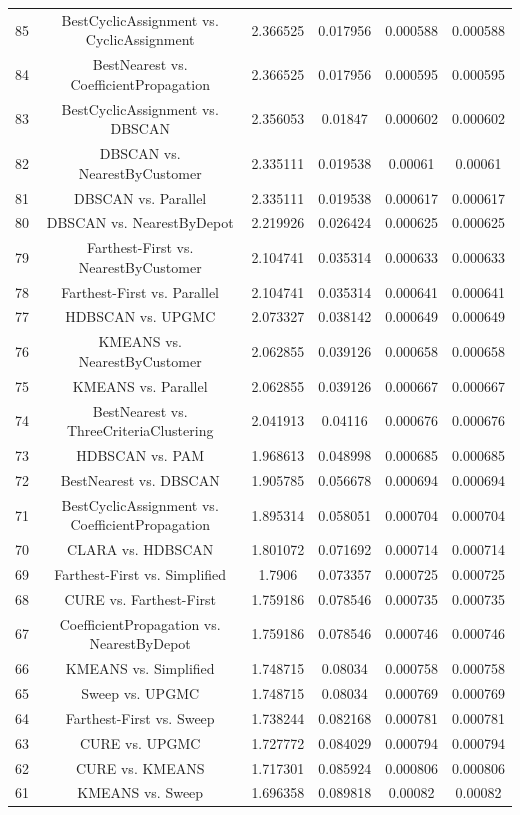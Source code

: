 \documentclass[a4paper,10pt]{article}
\begin{document}
\begin{landscape}
\begin{table}[!htp]
\begin{tabular}{cccccc}
85&BestCyclicAssignment vs. CyclicAssignment&2.366525&0.017956&0.000588&0.000588\\
84&BestNearest vs. CoefficientPropagation&2.366525&0.017956&0.000595&0.000595\\
83&BestCyclicAssignment vs. DBSCAN&2.356053&0.01847&0.000602&0.000602\\
82&DBSCAN vs. NearestByCustomer&2.335111&0.019538&0.00061&0.00061\\
81&DBSCAN vs. Parallel&2.335111&0.019538&0.000617&0.000617\\
80&DBSCAN vs. NearestByDepot&2.219926&0.026424&0.000625&0.000625\\
79&Farthest-First vs. NearestByCustomer&2.104741&0.035314&0.000633&0.000633\\
78&Farthest-First vs. Parallel&2.104741&0.035314&0.000641&0.000641\\
77&HDBSCAN vs. UPGMC&2.073327&0.038142&0.000649&0.000649\\
76&KMEANS vs. NearestByCustomer&2.062855&0.039126&0.000658&0.000658\\
75&KMEANS vs. Parallel&2.062855&0.039126&0.000667&0.000667\\
74&BestNearest vs. ThreeCriteriaClustering&2.041913&0.04116&0.000676&0.000676\\
73&HDBSCAN vs. PAM&1.968613&0.048998&0.000685&0.000685\\
72&BestNearest vs. DBSCAN&1.905785&0.056678&0.000694&0.000694\\
71&BestCyclicAssignment vs. CoefficientPropagation&1.895314&0.058051&0.000704&0.000704\\
70&CLARA vs. HDBSCAN&1.801072&0.071692&0.000714&0.000714\\
69&Farthest-First vs. Simplified&1.7906&0.073357&0.000725&0.000725\\
68&CURE vs. Farthest-First&1.759186&0.078546&0.000735&0.000735\\
67&CoefficientPropagation vs. NearestByDepot&1.759186&0.078546&0.000746&0.000746\\
66&KMEANS vs. Simplified&1.748715&0.08034&0.000758&0.000758\\
65&Sweep vs. UPGMC&1.748715&0.08034&0.000769&0.000769\\
64&Farthest-First vs. Sweep&1.738244&0.082168&0.000781&0.000781\\
63&CURE vs. UPGMC&1.727772&0.084029&0.000794&0.000794\\
62&CURE vs. KMEANS&1.717301&0.085924&0.000806&0.000806\\
61&KMEANS vs. Sweep&1.696358&0.089818&0.00082&0.00082\\

\end{tabular}
\end{table}
\end{landscape}
\end{document}
